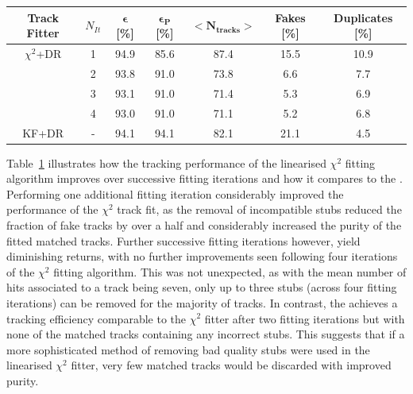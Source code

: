 \begin{table}[htbp]
\label{tab:chi2_iterations}
  \centering
 \begin{tabular}{ccccccc}
   \hline
   \bf{Track Fitter} & $N_{It}$ & \bf{$\bm{\epsilon}$ [\%]} & \bf{$\bm{\epsilon_{P}}$ [\%]} & $\bm{<N_{tracks}>}$ & \bf{Fakes [\%]} & \bf{Duplicates [\%]}  \\
   \hline
   $\chi^{2}$+DR & 1 & 94.9 & 85.6 & 87.4 & 15.5 & 10.9 \\  
   & 2 & 93.8 & 91.0 & 73.8 & 6.6 & 7.7 \\
   & 3 & 93.1 & 91.0 & 71.4 & 5.3 & 6.9 \\
   & 4 & 93.0 & 91.0 & 71.1 & 5.2 & 6.8 \\
   \hline
   KF+DR & - & 94.1 & 94.1 & 82.1 & 21.1 & 4.5 \\
   \hline
   
 \end{tabular}%
\end{table}

Table~\ref{tab:chi2_iterations} illustrates how the tracking performance of the linearised $\chi^{2}$ fitting algorithm improves over successive fitting iterations and how it compares to the \KF.
Performing one additional fitting iteration considerably improved the performance of the $\chi^{2}$ track fit, as the removal of incompatible stubs reduced the fraction of fake tracks by over a half and considerably increased the purity of the fitted matched tracks.
Further successive fitting iterations however, yield diminishing returns, with no further improvements seen following four iterations of the $\chi^{2}$ fitting algorithm.
This was not unexpected, as with the mean number of hits associated to a track being seven, only up to three stubs (across four fitting iterations) can be removed for the majority of tracks.
In contrast, the \KF achieves a tracking efficiency comparable to the $\chi^{2}$ fitter after two fitting iterations but with none of the matched tracks containing any incorrect stubs. 
This suggests that if a more sophisticated method of removing bad quality stubs were used in the linearised $\chi^{2}$ fitter, very few matched tracks would be discarded with improved purity.

